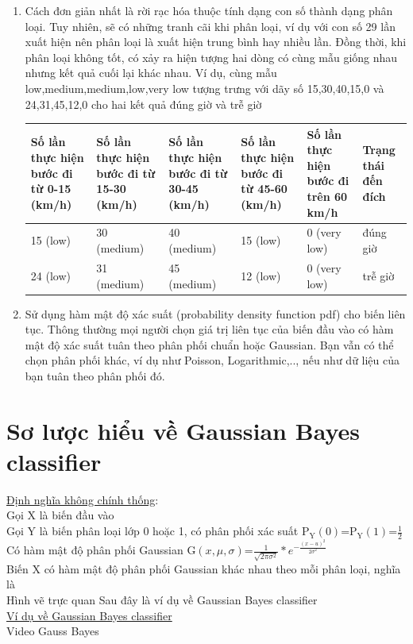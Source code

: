 \documentclass[a4paper, 13pt]{report}
\begin{document}
\begin{enumerate}
\item Cách đơn giản nhất là rời rạc hóa thuộc tính dạng con số thành dạng phân loại. Tuy nhiên, sẽ có những tranh cãi khi phân loại, ví dụ với con số 29 lần xuất hiện nên phân loại là xuất hiện trung bình hay nhiều lần. Đồng thời, khi phân loại không tốt, có xảy ra hiện tượng hai dòng có cùng mẫu giống nhau nhưng kết quả cuối lại khác nhau. Ví dụ, cùng mẫu low,medium,medium,low,very low tượng trưng với dãy số 15,30,40,15,0 và 24,31,45,12,0 cho hai kết quả đúng giờ và trễ giờ\\ 
\begin{flushleft}
\begin{tabular}{|p{2.6cm}|p{2.6cm}|p{2.6cm}|p{2.6cm}|p{2.6cm}|p{1.5cm}|}
\hline
Số lần thực hiện bước đi từ 0-15 (km/h)& Số lần thực hiện bước đi từ 15-30 (km/h) & Số lần thực hiện bước đi từ 30-45 (km/h) & Số lần thực hiện bước đi từ 45-60 (km/h) & Số lần thực hiện bước đi trên 60 km/h & Trạng thái đến đích \\ 
\hline
15 (low) & 30 (medium) & 40 (medium) & 15 (low) & 0 (very low) & đúng giờ\\
\hline
24 (low) & 31 (medium) & 45 (medium) & 12 (low) & 0 (very low) & trễ giờ\\
\hline
\end{tabular}
\end{flushleft}
\item Sử dụng hàm mật độ xác suất (probability density function pdf) cho biến liên tục. Thông thường mọi người chọn giá trị liên tục của biến đầu vào có hàm mật độ xác suất tuân theo phân phối chuẩn hoặc Gaussian. Bạn vẫn có thể chọn phân phối khác, ví dụ như Poisson, Logarithmic,.., nếu như dữ liệu của bạn tuân theo phân phối đó.    
\end{enumerate}
\section{Sơ lược hiểu về Gaussian Bayes classifier}
\underline{Định nghĩa không chính thống}:\\
Gọi X là biến đầu vào\\
Gọi Y là biến phân loại lớp 0 hoặc 1, có phân phối xác suất $\mathrm{P_Y}(0)$=$\mathrm{P_Y}(1)$=$\frac{1}{2}$\\
Có hàm mật độ phân phối Gaussian $\mathrm{G}(x,\mu,\sigma)$=$\frac{1}{\sqrt{2\pi\sigma^2}} * e^{-\frac{(x-u)^2}{2\sigma^2}}$\\
Biến X có hàm mật độ phân phối Gaussian khác nhau theo mỗi phân loại, nghĩa là \\
Hình vẽ trực quan    
Sau đây là ví dụ về Gaussian Bayes classifier\\
\underline{Ví dụ về Gaussian Bayes classifier}\\
Video Gauss Bayes\\
\end{document}
